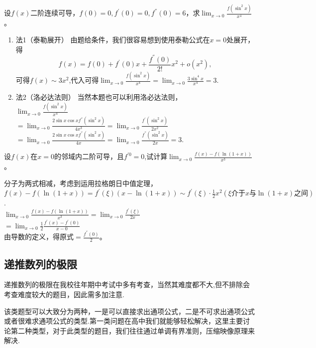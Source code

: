 \begin{example}
	设$f(x)$二阶连续可导，$f(0)=0,f^{'}(0)=0,f^{''}(0)=6$，求$\lim_{x \to 0}\frac{f(\sin ^2 x)}{x^4}$。
\end{example}
\begin{solution}
	\begin{enumerate}
		\item 法1（泰勒展开）
		由题给条件，我们很容易想到使用泰勒公式在$x=0$处展开，
得$$f(x)=f(0)+f^{'}(0)x+\frac{f^{''}(0)}{2!}x^2+o(x^2),$$
可得$f(x)\sim 3x^2$,代入可得$\lim_{x \to 0}\frac{f(\sin ^2 x)}{x^4}=\lim_{x \to 0}\frac{3\sin^4x}{x^4}=3$.
		\item 法2（洛必达法则）
		当然本题也可以利用洛必达法则，\\
$\lim_{x \to 0}\frac{f(\sin ^2 x)}{x^4}$\\
$=\lim_{x \to 0}\frac{2\sin x\cos xf^{''}(\sin^2x)}{4x^3}=\lim_{x\to 0}\frac{f^{'}(\sin^2x)}{2x^2}$\\
$=\lim_{x \to 0}\frac{2\sin x\cos xf^{''}(\sin^2x)}{4x}=\lim_{x \to 0}\frac{f^{''}(\sin^2x)}{2x}=3$.
	\end{enumerate}
\end{solution}

\begin{example}
	设$f(x)$在$x=0$的邻域内二阶可导，且$f^{'0}=0$,试计算$\lim_{x \to 0}\frac{f(x)-f(\ln(1+x))}{x^3}$。
	\begin{solution}
		分子为两式相减，考虑到运用拉格朗日中值定理，$f(x)-f(\ln(1+x))=f^{'}(\xi)(x-\ln (1+x))\sim f^{'}(\xi)\cdot \frac{1}{2}x^2(\xi\text{介于}x\text{与}\ln (1+x)\text{之间})$.\\
$\lim_{x \to 0}\frac{f(x)-f(\ln(1+x))}{x^3}=\lim_{x \to 0}\frac{f^{'}(\xi)}{2x}$\\
$=\lim_{x \to 0}\frac{1}{2}\frac{f^{'}(x)-f^{'}(0)}{x-0}$\\
由导数的定义，得原式$=\frac{f^{''}(0)}{2}$。
	\end{solution}
\end{example}

\subsection{递推数列的极限}

递推数列的极限在我校往年期中考试中多有考查，当然其难度都不大,但不排除会考查难度较大的题目，因此需多加注意.

该类题型可以大致分为两种，一是可以直接求出通项公式，二是不可求出通项公式或者很难求通项公式的类型.第一类问题在高中我们就能够轻松解决，这里主要讨论第二种类型，对于此类型的题目，我们往往通过单调有界准则，压缩映像原理来解决.

